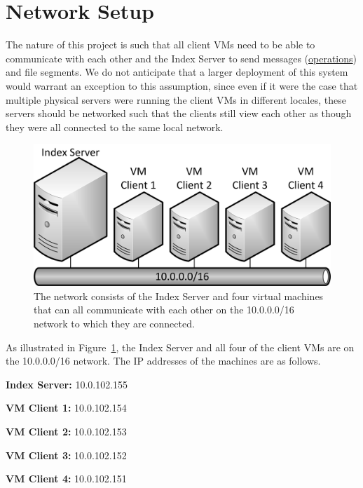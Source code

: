 \section{Network Setup}
	
	The nature of this project is such that all client VMs need to be able to communicate with each other and the Index Server to send messages (\hyperlink{sec:client_ops}{operations}) and file segments.  We do not anticipate that a larger deployment of this system would warrant an exception to this assumption, since even if it were the case that multiple physical servers were running the client VMs in different locales, these servers should be networked such that the clients still view each other as though they were all connected to the same local network.
	
	\begin{figure}[th]
		\centering
		\includegraphics[scale=1]{figs/network_setup}
		\caption{The network consists of the Index Server and four virtual machines that can all communicate with each other on the 10.0.0.0/16 network to which they are connected.}
		\label{fig:network_setup}
	\end{figure}
	
	As illustrated in Figure~\ref{fig:network_setup}, the Index Server and all four of the client VMs are on the 10.0.0.0/16 network.  The IP addresses of the machines are as follows.
	
	\begin{itemize*}
		\item \textbf{Index Server:} 10.0.102.155
		\item \textbf{VM Client 1:} 10.0.102.154
		\item \textbf{VM Client 2:} 10.0.102.153
		\item \textbf{VM Client 3:} 10.0.102.152
		\item \textbf{VM Client 4:} 10.0.102.151
	\end{itemize*}
